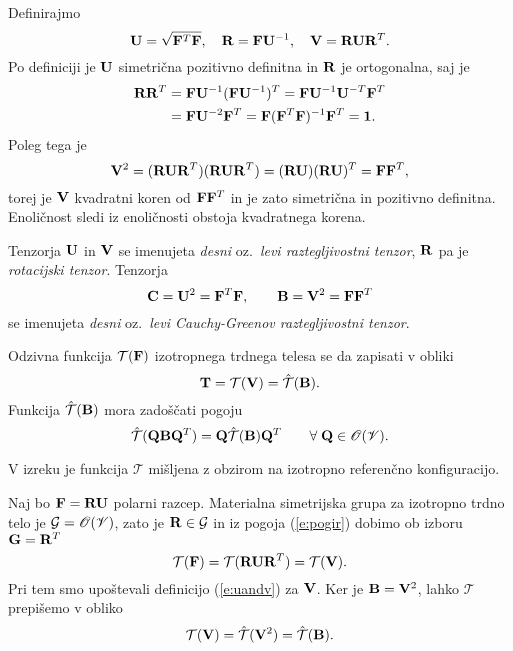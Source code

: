 	Definirajmo
	\begin{equation} \label{e:uandv}
		\mathbf U=\sqrt{\mathbf F^T\mathbf F},\quad\mathbf R=\mathbf F\mathbf U^{-1},\quad
		\mathbf V=\mathbf R\mathbf U\mathbf R^T.
	\end{equation}
	Po definiciji je $\mathbf U$ simetrična pozitivno definitna in $\mathbf R$ je ortogonalna, saj je
	\begin{align*}
		\mathbf R\mathbf R^T&=\mathbf F\mathbf U^{-1}(\mathbf F\mathbf U^{-1})^T
		=\mathbf F\mathbf U^{-1}\mathbf U^{-T}\mathbf F^T \\ &=\mathbf F\mathbf U^{-2}\mathbf F^T
		=\mathbf F(\mathbf F^T\mathbf F)^{-1}\mathbf F^T=\mathbf 1.
	\end{align*}
	Poleg tega je
	\[
		\mathbf V^2=(\mathbf R\mathbf U\mathbf R^T)(\mathbf R\mathbf U\mathbf R^T)
		=(\mathbf R\mathbf U)(\mathbf R\mathbf U)^T=\mathbf F\mathbf F^T,
	\]
	torej je $\mathbf V$ kvadratni koren od $\mathbf F\mathbf F^T$ in je zato
	simetrična in pozitivno definitna. Enoličnost sledi iz enoličnosti obstoja
	kvadratnega korena.
\endproof

Tenzorja $\mathbf U$ in $\mathbf V$ se imenujeta \emph{desni} oz.~\emph{levi raztegljivostni
tenzor}, $\mathbf R$ pa je \emph{rotacijski tenzor}. Tenzorja
\[
	\mathbf C=\mathbf U^2=\mathbf F^T\mathbf F,\qquad\mathbf B=\mathbf V^2=\mathbf F\mathbf F^T
\]
se imenujeta \emph{desni} oz.~\emph{levi Cauchy-Greenov raztegljivostni tenzor}.

\begin{izrek}
	Odzivna funkcija $\mathcal{T}(\mathbf F)$ izotropnega trdnega telesa se
	da zapisati v obliki
	\[
		\mathbf T=\mathcal{T}(\mathbf V)=\hat{\mathcal{T}}(\mathbf B).
	\]
	Funkcija $\hat{\mathcal{T}}(\mathbf B)$ mora zadoščati pogoju
	\[
		\hat{\mathcal{T}}(\mathbf Q\mathbf B\mathbf Q^T)=\mathbf Q\hat{\mathcal{T}}(\mathbf B)\mathbf Q^T
		\qquad\forall\;\mathbf Q\in\mathscr{O}(\mathscr V).
	\]
\end{izrek}

V izreku je funkcija $\mathcal{T}$ mišljena z obzirom na izotropno referenčno konfiguracijo.

\proof
	Naj bo $\mathbf F=\mathbf R\mathbf U$ polarni razcep. Materialna simetrijska grupa za izotropno
	trdno telo je $\mathcal{G}=\mathscr{O}(\mathscr V)$, zato je $\mathbf R\in\mathcal{G}$
	in iz pogoja (\ref{e:pogir}) dobimo ob izboru $\mathbf G=\mathbf R^T$
	\[
		\mathcal{T}(\mathbf F)=\mathcal{T}(\mathbf R\mathbf U\mathbf R^T)=\mathcal{T}(\mathbf V).
	\]
	Pri tem smo upoštevali definicijo (\ref{e:uandv}) za $\mathbf V$. Ker je $\mathbf B=\mathbf V^2$,
	lahko $\mathcal{T}$ prepišemo v obliko
	\[
		\mathcal{T}(\mathbf V)=\hat{\mathcal{T}}(\mathbf V^2)=\hat{\mathcal{T}}(\mathbf B).
	\]
	
	
	
\endproof